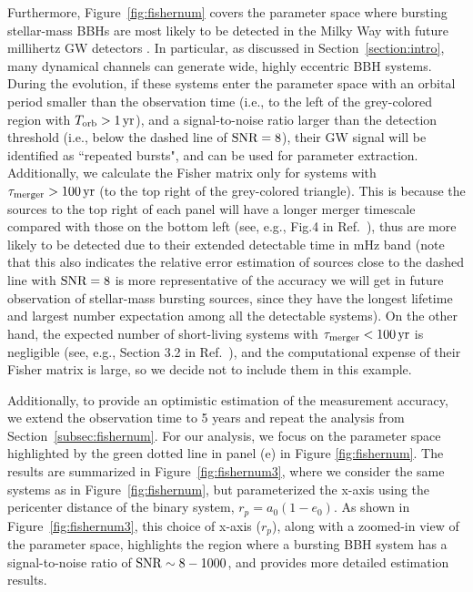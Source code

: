 \documentclass[%
 reprint,
 amsmath,amssymb,
 aps,
]{revtex4-2}
\begin{document}
Furthermore, Figure~\ref{fig:fishernum} covers the parameter space where bursting stellar-mass BBHs are most likely to be detected in the Milky Way with future millihertz GW detectors \citep{Xuan+23b,Xuan24bkg}. In particular, as discussed in Section~\ref{section:intro}, many dynamical channels can generate wide, highly eccentric BBH systems. During the evolution, if these systems enter the parameter space with an orbital period smaller than the observation time (i.e., to the left of the grey-colored region with $T_{\rm orb} > 1\,\rm yr$), and a signal-to-noise ratio larger than the detection threshold (i.e., below the dashed line of $\rm SNR=8$), their GW signal will be identified as ``repeated bursts", and can be used for parameter extraction. Additionally, we calculate the Fisher matrix only for systems with $\tau_{\rm merger}>100\,\rm yr$ (to the top right of the grey-colored triangle). This is because the sources to the top right of each panel will have a longer merger timescale compared with those on the bottom left (see, e.g., Fig.4 in Ref.~\citep{Xuan+23b}), thus are more likely to be detected due to their extended detectable time in mHz band (note that this also indicates the relative error estimation of sources close to the dashed line with $\rm SNR=8$ is more representative of the accuracy we will get in future observation of stellar-mass bursting sources, since they have the longest lifetime and largest number expectation among all the detectable systems). On the other hand, the expected number of short-living systems with $\tau_{\rm merger}<100\,\rm yr$ is negligible (see, e.g., Section 3.2 in Ref.~\citep{Xuan+23b}), and the computational expense of their Fisher matrix is large, so we decide not to include them in this example. 


Additionally, to provide an optimistic estimation of the measurement accuracy, we extend the observation time to 5 years and repeat the analysis from Section~\ref{subsec:fishernum}. For our analysis, we focus on the parameter space highlighted by the green dotted line in panel (e) in Figure \ref{fig:fishernum}. The results are summarized in Figure~\ref{fig:fishernum3}, where we consider the same systems as in Figure~\ref{fig:fishernum}, but parameterized the x-axis using the pericenter distance of the binary system, $r_p= a_0(1-e_0)$. As shown in Figure~\ref{fig:fishernum3}, this choice of x-axis ($r_p$), along with a zoomed-in view of the parameter space, highlights the region where a bursting BBH system has a signal-to-noise ratio of $\rm SNR\sim 8 - 1000$, and provides more detailed estimation results. %
\end{document}

